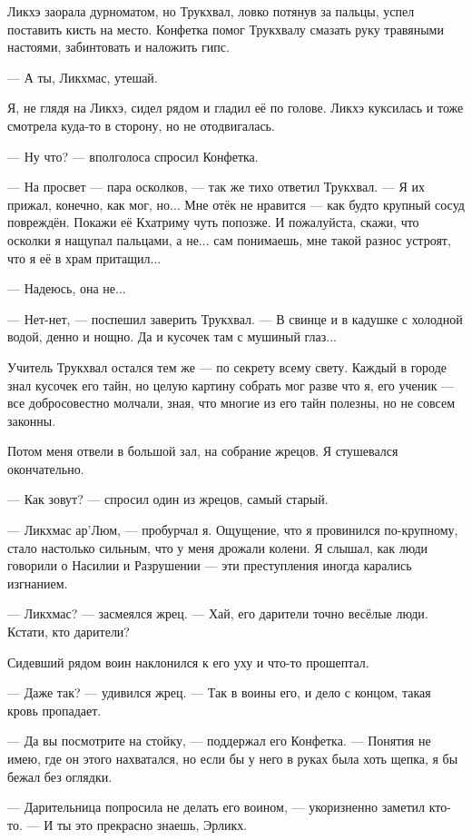 Ликхэ заорала дурноматом, но Трукхвал, ловко потянув за пальцы, успел поставить кисть на место.
Конфетка помог Трукхвалу смазать руку травяными настоями, забинтовать и наложить гипс.

--- А ты, Ликхмас, утешай.

Я, не глядя на Ликхэ, сидел рядом и гладил её по голове.
Ликхэ куксилась и тоже смотрела куда-то в сторону, но не отодвигалась.

--- Ну что? --- вполголоса спросил Конфетка.

--- На просвет --- пара осколков, --- так же тихо ответил Трукхвал.
--- Я их прижал, конечно, как мог, но...
Мне отёк не нравится --- как будто крупный сосуд повреждён.
Покажи её Кхатриму чуть попозже.
И пожалуйста, скажи, что осколки я нащупал пальцами, а не... сам понимаешь, мне такой разнос устроят, что я её в храм притащил...

--- Надеюсь, она не...

--- Нет-нет, --- поспешил заверить Трукхвал.
--- В свинце и в кадушке с холодной водой, денно и нощно.
Да и кусочек там с мушиный глаз...

Учитель Трукхвал остался тем же --- по секрету всему свету.
Каждый в городе знал кусочек его тайн, но целую картину собрать мог разве что я, его ученик --- все добросовестно молчали, зная, что многие из его тайн полезны, но не совсем законны.

Потом меня отвели в большой зал, на собрание жрецов.
Я стушевался окончательно.

--- Как зовут? --- спросил один из жрецов, самый старый.

--- Ликхмас ар’Люм, --- пробурчал я.
Ощущение, что я провинился по-крупному, стало настолько сильным, что у меня дрожали колени.
Я слышал, как люди говорили о Насилии и Разрушении --- эти преступления иногда карались изгнанием.

--- Ликхмас? --- засмеялся жрец.
--- Хай, его дарители точно весёлые люди.
Кстати, кто дарители?

Сидевший рядом воин наклонился к его уху и что-то прошептал.

--- Даже так? --- удивился жрец.
--- Так в воины его, и дело с концом, такая кровь пропадает.

--- Да вы посмотрите на стойку, --- поддержал его Конфетка.
--- Понятия не имею, где он этого нахватался, но если бы у него в руках была хоть щепка, я бы бежал без оглядки.

--- Дарительница попросила не делать его воином, --- укоризненно заметил кто-то.
--- И ты это прекрасно знаешь, Эрликх.

